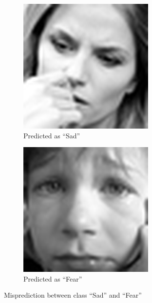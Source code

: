 \documentclass[12pt,a4paper]{extarticle}
\begin{document}
\begin{enumerate}
  \begin{figure}[ht]
    \begin{subfigure}[t]{0.5\textwidth}
      \centering
      \includegraphics[width=0.8\linewidth]{images/train-image-2.png}
      \caption{Predicted as ``Sad''}
      \label{fig:train-image-2}
    \end{subfigure}
    \begin{subfigure}[t]{0.5\textwidth}
      \centering
      \includegraphics[width=0.8\linewidth]{images/train-image-6.png}
      \caption{Predicted as ``Fear''}
      \label{fig:train-image-6}
    \end{subfigure}
    \caption{Misprediction between class ``Sad'' and ``Fear''}
    \label{fig:misprediction}
  \end{figure}


\end{enumerate}
\end{document}
